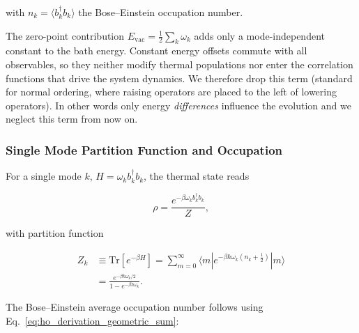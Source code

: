\noindent
with $n_k = \langle b_k^{\dagger} b_k \rangle$ the Bose--Einstein occupation number.


\noindent
The zero-point contribution $E_{\text{vac}} = \tfrac{1}{2} \sum_k \omega_k$ adds only a mode-independent constant to the bath energy. Constant energy offsets commute with all observables, so they neither modify thermal populations nor enter the correlation functions that drive the system dynamics. We therefore drop this term (standard for normal ordering, where raising operators are placed to the left of lowering operators). In other words only energy \emph{differences} influence the evolution and we neglect this term from now on.



\subsubsection{Single Mode Partition Function and Occupation}
\label{subsubsec:single_mode}

\noindent
For a single mode $k$, $H=\omega_k b^{\dagger}_k b_k$, the thermal state reads

\begin{equation} \label{eq:ho_single_mode_density_matrix}
	\rho = \frac{e^{-\beta \omega_k b^{\dagger}_k b_k}}{Z},
\end{equation}

\noindent
with partition function

\begin{align} \label{eq:ho_partition_function}
        Z_k & \equiv \mathrm{Tr}\left[e^{-\beta H}\right] = \sum_{m=0}^{\infty} \langle m | e^{-\beta \hbar \omega_k (n_k + \frac{1}{2})} | m \rangle \\
        & = \frac{e^{-\beta \hbar \omega_k / 2}}{1 - e^{-\beta \hbar \omega_k}}.
\end{align}

\noindent
The Bose--Einstein average occupation number follows using Eq.~\eqref{eq:ho_derivation_geometric_sum}:

